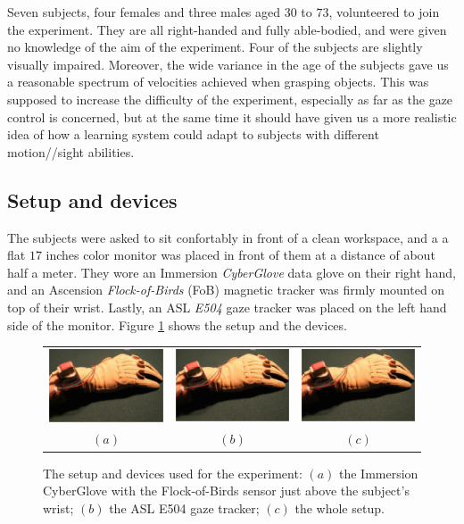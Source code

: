 \documentclass[a4paper,10pt,conference]{ieeeconf}
\begin{document}
Seven subjects, four females and three males aged $30$ to $73$,
volunteered to join the experiment. They are all right-handed and
fully able-bodied, and were given no knowledge of the aim of the
experiment. Four of the subjects are slightly visually
impaired. Moreover, the wide variance in the age of the subjects gave
us a reasonable spectrum of velocities achieved when grasping objects.
This was supposed to increase the difficulty of the experiment,
especially as far as the gaze control is concerned, but at the same
time it should have given us a more realistic idea of how a learning
system could adapt to subjects with different motion//sight abilities.

\subsection{Setup and devices}

The subjects were asked to sit confortably in front of a clean
workspace, and a a flat $17$ inches color monitor was placed in front
of them at a distance of about half a meter. They wore an Immersion
\emph{CyberGlove} data glove \cite{cyberglove} on their right hand,
and an Ascension \emph{Flock-of-Birds} (FoB) \cite{fob} magnetic
tracker was firmly mounted on top of their wrist. Lastly, an ASL
\emph{E504} gaze tracker \cite{e504} was placed on the left hand side
of the monitor. Figure \ref{fig:devices} shows the setup and the
devices.

\begin{figure}[htbp]
  \begin{center}
    \begin{tabular}{ccc}
      \includegraphics[width=0.31\linewidth]{devices1.eps} &
      \includegraphics[width=0.31\linewidth]{devices1.eps} &
      \includegraphics[width=0.31\linewidth]{devices1.eps} \\
      $(a)$ & $(b)$ & $(c)$
    \end{tabular}
    \caption{The setup and devices used for the experiment: $(a)$ the
    Immersion CyberGlove with the Flock-of-Birds sensor just above the
    subject's wrist; $(b)$ the ASL E504 gaze tracker; $(c)$ the whole
    setup.}
    \label{fig:devices}
  \end{center}
\end{figure}
\end{document}
